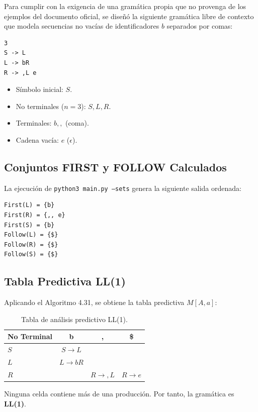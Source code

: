 \documentclass[11pt,a4paper]{article}
\begin{document}
Para cumplir con la exigencia de una gramática propia que no provenga de los ejemplos del documento oficial, se diseñó la siguiente gramática libre de contexto que modela secuencias no vacías de identificadores $b$ separados por comas:

\begin{lstlisting}
3
S -> L
L -> bR
R -> ,L e
\end{lstlisting}

\begin{itemize}
    \item Símbolo inicial: $S$.
    \item No terminales ($n=3$): $S, L, R$.
    \item Terminales: $b, ,$ (coma).
    \item Cadena vacía: $e$ ($\epsilon$).
\end{itemize}

\subsection{Conjuntos FIRST y FOLLOW Calculados}

La ejecución de \texttt{python3 main.py --sets} genera la siguiente salida ordenada:
\begin{lstlisting}
First(L) = {b}
First(R) = {,, e}
First(S) = {b}
Follow(L) = {$}
Follow(R) = {$}
Follow(S) = {$}
\end{lstlisting}

\subsection{Tabla Predictiva LL(1)}

Aplicando el Algoritmo 4.31, se obtiene la tabla predictiva $M[A, a]$:

\begin{table}[h!]
\centering
\begin{tabular}{lccc}
\toprule
\textbf{No Terminal} & \textbf{b} & \textbf{,} & \textbf{\$} \\
\midrule
$S$ & $S \rightarrow L$ & & \\
$L$ & $L \rightarrow bR$ & & \\
$R$ & & $R \rightarrow ,L$ & $R \rightarrow e$ \\
\bottomrule
\end{tabular}
\caption{Tabla de análisis predictivo LL(1).}
\end{table}

Ninguna celda contiene más de una producción. Por tanto, la gramática es \textbf{LL(1)}.
\end{document}
